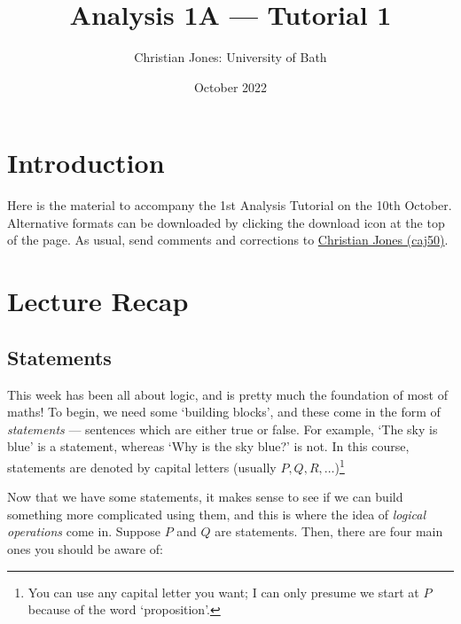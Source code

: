 \documentclass[
  12pt,
  a4paper]{extarticle}
\title{Analysis 1A --- Tutorial 1}
\author{Christian Jones: University of Bath}
\date{October 2022}
\theoremstyle{plain}
\theoremstyle{definition}
\theoremstyle{plain}
\theoremstyle{plain}
\theoremstyle{plain}
\theoremstyle{plain}
\theoremstyle{definition}
\theoremstyle{definition}
\newtheorem*{Order Axioms*}{Order Axioms}\newtheorem{Order Axioms}{Order Axioms}[section]
\theoremstyle{remark}
\theoremstyle{remark}
\renewcommand{\;}{\,}
\begin{document}
\maketitle

{
\setcounter{tocdepth}{2}
\tableofcontents
}
\newpage
{}

\hypertarget{introduction}{%
\section*{Introduction}\label{introduction}}

Here is the material to accompany the 1st Analysis Tutorial on the 10th October. Alternative formats can be downloaded by clicking the download icon at the top of the page. As usual, send comments and corrections to \href{mailto:caj50@bath.ac.uk}{Christian Jones (caj50)}.

\hypertarget{lecture-recap}{%
\section{Lecture Recap}\label{lecture-recap}}

\hypertarget{statements}{%
\subsection{Statements}\label{statements}}

This week has been all about logic, and is pretty much the foundation of most of maths! To begin, we need some `building blocks', and these come in the form of \emph{statements} --- sentences which are either true or false. For example, \color{blue} `The sky is blue' \color{black} is a statement, whereas \color{red} `Why is the sky blue?' \color{black} is not. In this course, statements are denoted by capital letters (usually \(P,Q,R,\ldots\))\footnote{You can use any capital letter you want; I can only presume we start at \(P\) because of the word `proposition'.}

Now that we have some statements, it makes sense to see if we can build something more complicated using them, and this is where the idea of \emph{logical operations} come in. Suppose \(P\) and \(Q\) are statements. Then, there are four main ones you should be aware of:
\end{document}
